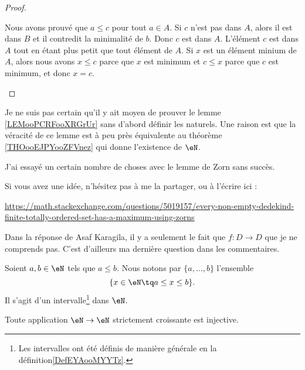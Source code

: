\begin{proof}
\begin{subproof}
		Nous avons prouvé que \( a\leq c\) pour tout \( a\in A\).
		\spitem[\( c\in A\)]
		Si \( c\) n'est pas dans \( A\), alors il est dans \( B\) et il contredit la minimalité de \( b\). Donc \( c\) est dans \( A\).
		\spitem[Conclusion]
		L'élément \( c\) est dans \( A\) tout en étant plus petit que tout élément de \( A\).
		\spitem[Unicité]
		Si \( x\) est un élément minium de \( A\), alors nous avons \( x\leq c\) parce que \( x\) est minimum et \( c\leq x\) parce que \( c\) est minimum, et donc \( x=c\).
	\end{subproof}
\end{proof}


\begin{probleme}		\label{PROBooUCQFooTugfDl}
	Je ne suis pas certain qu'il y ait moyen de prouver le lemme \ref{LEMooPCRFooXRGrUr} sans d'abord définir les naturels. Une raison est que la véracité de ce lemme est à peu près équivalente au théorème \ref{THOooEJPYooZFVnez} qui donne l'existence de \( \eN\).

	J'ai essayé un certain nombre de choses avec le lemme de Zorn sans succès.

	Si vous avez une idée, n'hésitez pas à me la partager, ou à l'écrire ici :
	\begin{center}
		\url{https://math.stackexchange.com/questions/5019157/every-non-empty-dedekind-finite-totally-ordered-set-has-a-maximum-using-zorns}
	\end{center}

	Dans la réponse de Asaf Karagila, il y a seulement le fait que \(f \colon D\to D  \) que je ne comprends pas. C'est d'ailleurs ma dernière question dans les commentaires.
\end{probleme}


\begin{definition}      \label{DEFooKBUFooLvMHrf}
	Soient \( a,b\in \eN\) tels que \( a\leq b\). Nous notons par \( \{ a,\ldots, b \}\) l'ensemble
	\begin{equation}
		\{ x\in \eN\tq a\leq x\leq b \}.
	\end{equation}
 	Il s'agit d'un intervalle\footnote{Les intervalles ont été définis de manière générale en la définition\ref{DefEYAooMYYTz}.} dans \( \eN \). 
\end{definition}

\begin{proposition}     \label{PROPooFYMJooWihvhk}
	Toute application \( \eN\to \eN\) strictement croissante est injective.
\end{proposition}

